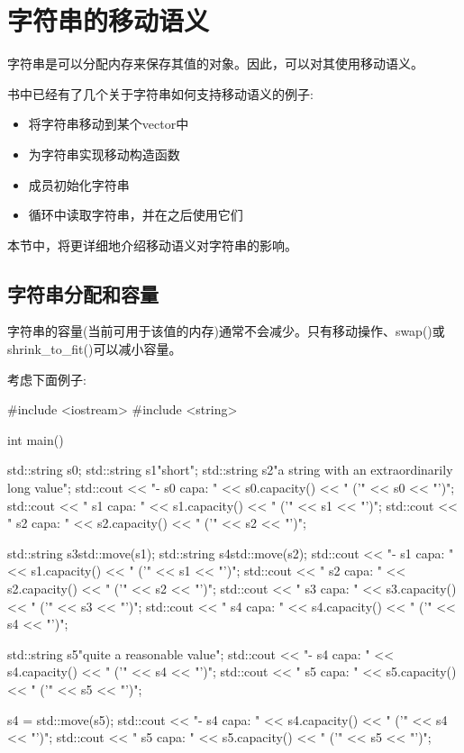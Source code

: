 \section{字符串的移动语义}
字符串是可以分配内存来保存其值的对象。因此，可以对其使用移动语义。

书中已经有了几个关于字符串如何支持移动语义的例子:

\begin{itemize}
	\item 将字符串移动到某个vector中
	\item 为字符串实现移动构造函数
	\item 成员初始化字符串
	\item 循环中读取字符串，并在之后使用它们
\end{itemize}

本节中，将更详细地介绍移动语义对字符串的影响。

\subsection{字符串分配和容量}

字符串的容量(当前可用于该值的内存)通常不会减少。只有移动操作、swap()或shrink_to_fit()可以减小容量。

考虑下面例子:

\begin{cppcode}
#include <iostream>
#include <string>

int main()
{
	std::string s0;
	std::string s1{"short"};
	std::string s2{"a string with an extraordinarily long value"};
	std::cout << "- s0 capa: " << s0.capacity() << " ('" << s0 << "')\n";
	std::cout << " s1 capa: " << s1.capacity() << " ('" << s1 << "')\n";
	std::cout << " s2 capa: " << s2.capacity() << " ('" << s2 << "')\n";

	std::string s3{std::move(s1)};
	std::string s4{std::move(s2)};
	std::cout << "- s1 capa: " << s1.capacity() << " ('" << s1 << "')\n";
	std::cout << " s2 capa: " << s2.capacity() << " ('" << s2 << "')\n";
	std::cout << " s3 capa: " << s3.capacity() << " ('" << s3 << "')\n";
	std::cout << " s4 capa: " << s4.capacity() << " ('" << s4 << "')\n";

	std::string s5{"quite a reasonable value"};
	std::cout << "- s4 capa: " << s4.capacity() << " ('" << s4 << "')\n";
	std::cout << " s5 capa: " << s5.capacity() << " ('" << s5 << "')\n";

	s4 = std::move(s5);
	std::cout << "- s4 capa: " << s4.capacity() << " ('" << s4 << "')\n";
	std::cout << " s5 capa: " << s5.capacity() << " ('" << s5 << "')\n";
}
\end{cppcode}

